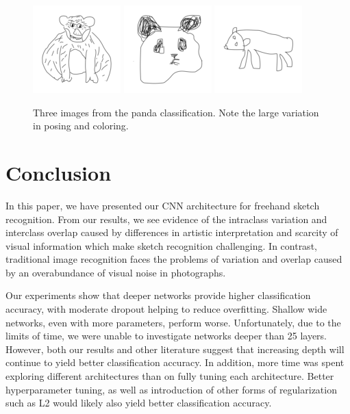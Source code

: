 \documentclass[10pt,twocolumn,letterpaper]{article}
\begin{document}
\begin{figure}[h]
	\begin{center}
	\includegraphics[width=0.3\linewidth]{panda1}
	\includegraphics[width=0.3\linewidth]{panda2}
	\includegraphics[width=0.3\linewidth]{panda3}
	\caption{Three images from the panda classification. Note the large variation in posing and coloring.}
	\end{center}
\end{figure}

\section{Conclusion}

In this paper, we have presented our CNN architecture for freehand sketch recognition. From our results, we see evidence of the intraclass variation and interclass overlap caused by differences in artistic interpretation and scarcity of visual information which make sketch recognition challenging. In contrast, traditional image recognition faces the problems of variation and overlap caused by an overabundance of visual noise in photographs.

Our experiments show that deeper networks provide higher classification accuracy, with moderate dropout helping to reduce overfitting. Shallow wide networks, even with more parameters, perform worse. Unfortunately, due to the limits of time, we were unable to investigate networks deeper than 25 layers. However, both our results and other literature suggest that increasing depth will continue to yield better classification accuracy. In addition, more time was spent exploring different architectures than on fully tuning each architecture. Better hyperparameter tuning, as well as introduction of other forms of regularization such as L2 would likely also yield better classification accuracy.
\end{document}
